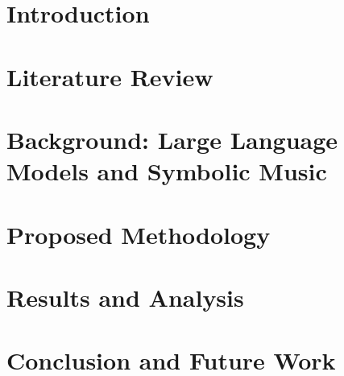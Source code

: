 \documentclass[12pt,a4paper]{report}
\begin{document}






\newpage
{}


\newpage
{}


\tableofcontents
\label{toc}
\listoffigures
\listoftables

\headerregularsection

\newpage

\chapter{Introduction}
\label{chap:intro}


\newpage

\chapter{Literature Review}
\label{chap:literature-review}


\newpage

\chapter{Background: Large Language Models and Symbolic Music}
\label{chap:background}


\newpage

\chapter{Proposed Methodology}
\label{chap:methodology}


\newpage

\chapter{Results and Analysis}
\label{chap:results-analysis}


\newpage

\chapter{Conclusion and Future Work}
\label{chap:conclusion-future-work}


\printbibliography[heading=bibintoc, title={Bibliography}]
\end{document}
